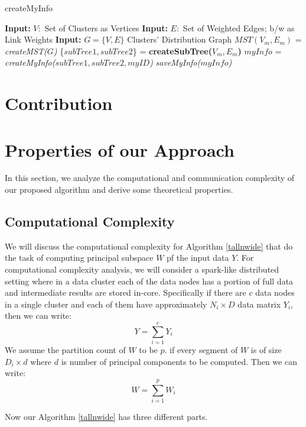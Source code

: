 \documentclass[10pt,conference,letterpaper]{IEEEtran}
\begin{document}
\begin{algorithm}[!htbp]
    \label{info}
	\caption{createMyInfo}
	\begin{algorithmic} [1]
	\State \textbf{Input: }$V: $ Set of Clusters as Vertices
	\State \textbf{Input: }$E: $ Set of Weighted Edges; b/w as Link Weights
	\State \textbf{Input: }$G=\{V,E\}$ Clusters' Distribution Graph
	\State $MST(V_m,E_m)$ = \textit{createMST($G$)}
	\State \{$subTree1, subTree2$\} = \textbf{createSubTree($V_m,E_m$)}
	\State $myInfo$ = \textit{createMyInfo($subTree1, subTree2, myID$)}
	\State \textit{saveMyInfo($myInfo$)}
	\end{algorithmic}
\end{algorithm}









\section{Contribution}

\section{Properties of our Approach}
In this section, we analyze the computational and communication complexity of our proposed algorithm and derive some theoretical properties.

\subsection{Computational Complexity}
We will discuss the computational complexity for Algorithm \ref{tallnwide} that do the task of computing principal subspace $W$ pf the input data $Y$. For computational complexity analysis, we will consider a spark-like \cite{spark} distributed setting where in a data cluster each of the data nodes has a portion of full data and intermediate results are stored in-core. Specifically if there are $c$ data nodes in a single cluster and each of them have approximately $N_i \times D$ data matrix $Y_i$, then we can write:
 $$Y = \sum _{i=1}^c Y_i$$
We assume the partition count of $W$ to be $p$. if every segment of $W$ is of size $D_i \times d$ where $d$ is number of principal components to be computed. Then we can write:
$$W = \sum _{i=1}^p W_i$$

Now our Algorithm \ref{tallnwide} has three different parts.
\end{document}
